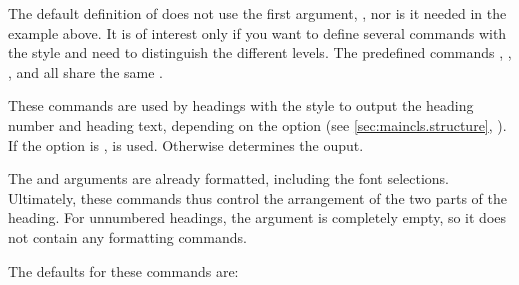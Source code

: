 The default definition of  does not use the
first argument, , nor is it needed in the example above. It is of
interest only if you want to define several commands with the 
style and need to distinguish the different levels. The predefined commands
, ,
, and  all share
the same  .%
\EndIndexGroup


\begin{Declaration}
\end{Declaration}
These commands are used
by headings with the  style to output the heading number and
heading text, depending on the
%
 option (see
\autoref{sec:maincls.structure},
). If the option is ,
 is used. Otherwise
 determines the ouput.

The  and  arguments are already formatted, including
the font selections. Ultimately, these commands thus control the arrangement
of the two parts of the heading. For unnumbered headings, the 
argument is completely empty, so it does not contain any formatting commands.

The defaults for these commands are:
\begin{lstcode}
  \newcommand{\chapterlinesformat}[3]{%
    \@hangfrom{#2}{#3}%
  }
  \newcommand{\chapterlineswithprefixformat}[3]{%
    #2#3%
  }
\end{lstcode}

